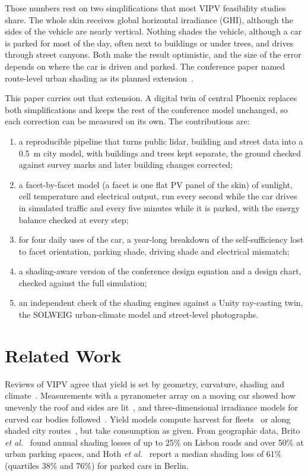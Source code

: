 \documentclass[lettersize,journal]{IEEEtran}
\begin{document}
Those numbers rest on two simplifications that most VIPV feasibility studies share. The whole skin receives global horizontal irradiance (GHI), although the sides of the vehicle are nearly vertical. Nothing shades the vehicle, although a car is parked for most of the day, often next to buildings or under trees, and drives through street canyons. Both make the result optimistic, and the size of the error depends on where the car is driven and parked. The conference paper named route-level urban shading as its planned extension~\cite{ref_conf}.

This paper carries out that extension. A digital twin of central Phoenix replaces both simplifications and keeps the rest of the conference model unchanged, so each correction can be measured on its own. The contributions are:
\begin{enumerate}
\item a reproducible pipeline that turns public lidar, building and street data into a \SI{0.5}{m} city model, with buildings and trees kept separate, the ground checked against survey marks and later building changes corrected;
\item a facet-by-facet model (a facet is one flat PV panel of the skin) of sunlight, cell temperature and electrical output, run every second while the car drives in simulated traffic and every five minutes while it is parked, with the energy balance checked at every step;
\item for four daily uses of the car, a year-long breakdown of the self-sufficiency lost to facet orientation, parking shade, driving shade and electrical mismatch;
\item a shading-aware version of the conference design equation and a design chart, checked against the full simulation;
\item an independent check of the shading engines against a Unity ray-casting twin, the SOLWEIG urban-climate model and street-level photographs.
\end{enumerate}

\section{Related Work}
Reviews of VIPV agree that yield is set by geometry, curvature, shading and climate~\cite{ref_commault,ref_samadi,ref_coleneso}. Measurements with a pyranometer array on a moving car showed how unevenly the roof and sides are lit~\cite{ref_ota}, and three-dimensional irradiance models for curved car bodies followed~\cite{ref_araki}. Yield models compute harvest for fleets~\cite{ref_carr} or along shaded city routes~\cite{ref_sanjose}, but take consumption as given. From geographic data, Brito \emph{et al.}~\cite{ref_brito} found annual shading losses of up to 25\% on Lisbon roads and over 50\% at urban parking spaces, and Hoth \emph{et al.}~\cite{ref_hoth} report a median shading loss of 61\% (quartiles 38\% and 76\%) for parked cars in Berlin.
\end{document}
